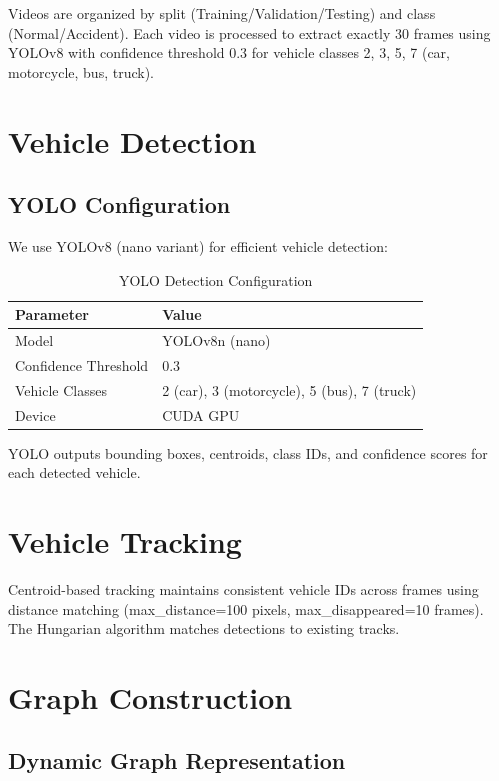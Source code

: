 Videos are organized by split (Training/Validation/Testing) and class (Normal/Accident). Each video is processed to extract exactly 30 frames using YOLOv8 with confidence threshold 0.3 for vehicle classes 2, 3, 5, 7 (car, motorcycle, bus, truck).

\section{Vehicle Detection}

\subsection{YOLO Configuration}

We use YOLOv8 (nano variant) for efficient vehicle detection:

\begin{table}[H]
\centering
\caption{YOLO Detection Configuration}
\label{tab:yolo_config}
\begin{tabular}{ll}
\toprule
\textbf{Parameter} & \textbf{Value} \\
\midrule
Model & YOLOv8n (nano) \\
Confidence Threshold & 0.3 \\
Vehicle Classes & 2 (car), 3 (motorcycle), 5 (bus), 7 (truck) \\
Device & CUDA GPU \\
\bottomrule
\end{tabular}
\end{table}

YOLO outputs bounding boxes, centroids, class IDs, and confidence scores for each detected vehicle.


\section{Vehicle Tracking}

Centroid-based tracking maintains consistent vehicle IDs across frames using distance matching (max\_distance=100 pixels, max\_disappeared=10 frames). The Hungarian algorithm matches detections to existing tracks.


\section{Graph Construction}

\subsection{Dynamic Graph Representation}


